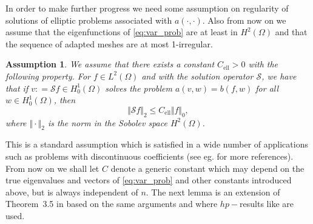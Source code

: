 \documentclass[preprint,12pt]{elsarticle}
\newtheorem{assumption}[theorem]{Assumption}
\newcommand{\cS}{\mathcal{S}}
\begin{document}
In order to make further progress we need some assumption on
regularity of solutions of elliptic problems associated with $a(\cdot,
\cdot)$. Also from now on we assume that the eigenfunctions of \eqref{eq:var_prob} are at least in $H^2(\Omega)$ and that the sequence of adapted meshes are at most 1-irregular.
\begin{assumption}\label{ass:ell}
 We assume that there exists a constant
$C_\mathrm{ell}>0$ with the following property.
For   $f \in L^2(\Omega)$ and with the solution operator $\cS$, we have that if  $v: = \cS f\in H^1_0(\Omega)$ solves  the
problem {$a(v,w) = b(f,w) $} for all $w \in
H^1_0(\Omega)$, then 
\begin{equation}\label{eq:ass_reg_pcf}
\Vert \cS f \Vert_{{2}} \leq
C_\mathrm{ell}\Vert f \Vert_0,
\end{equation}
where  $\Vert \cdot \Vert_{2}$ is the norm in   the Sobolev space $H^{2}(\Omega)$.
\end{assumption}
This is a standard assumption which is satisfied in a wide number of
applications such as problems with discontinuous coefficients
(see eg. \cite{conv_sinum} for more references).\\

From now on we shall let $C$ denote  a generic constant which 
may depend
on the 
true eigenvalues and vectors of \eqref{eq:var_prob} and other
constants introduced above, but is always independent of
$n$.  The next lemma is an extension of Theorem~3.5 in \cite{pcf_apost} based on the same arguments
and where $hp-$results like \cite[Theorem~4.72]{schwab} are used.
\end{document}
